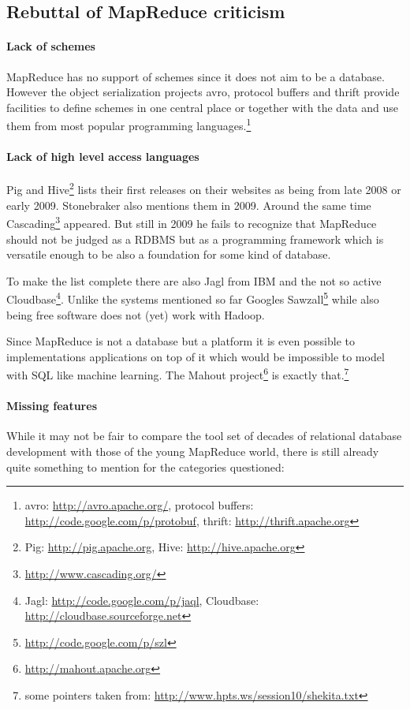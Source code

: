 \documentclass[12pt,a4paper]{scrartcl}		%
\begin{document}
\subsection{Rebuttal of MapReduce criticism}
\paragraph{Lack of schemes}
MapReduce has no support of schemes since it does not aim to be a database. However the object serialization projects avro, protocol buffers and thrift provide facilities to define schemes in one central place or together with the data and use them from most popular programming languages.\footnote{avro: \url{http://avro.apache.org/}, protocol buffers: \url{http://code.google.com/p/protobuf}, thrift: \url{http://thrift.apache.org}}

\paragraph{Lack of high level access languages}
Pig and Hive\footnote{Pig: \url{http://pig.apache.org}, Hive: \url{http://hive.apache.org}} lists their first releases on their websites as being from late 2008 or early 2009. Stonebraker also mentions them in 2009\cite[p. 3, sec. 3.3 programming model]{Pavlo09}. Around the same time Cascading\footnote{\url{http://www.cascading.org/}} appeared. But still in 2009 he fails to recognize that MapReduce should not be judged as a RDBMS but as a programming framework which is versatile enough to be also a foundation for some kind of database.

To make the list complete there are also Jagl from IBM and the not so active Cloudbase\footnote{Jagl: \url{http://code.google.com/p/jaql}, Cloudbase: \url{http://cloudbase.sourceforge.net}}. Unlike the systems mentioned so far Googles Sawzall\footnote{\url{http://code.google.com/p/szl}} while also being free software does not (yet) work with Hadoop.

Since MapReduce is not a database but a platform it is even possible to implementations applications on top of it which would be impossible to model with SQL like machine learning. The Mahout project\footnote{\url{http://mahout.apache.org}} is exactly that.\footnote{some pointers taken from: \url{http://www.hpts.ws/session10/shekita.txt}}

\paragraph{Missing features}
While it may not be fair to compare the tool set of decades of relational database development with those of the young MapReduce world, there is still already quite something to mention for the categories questioned:
\end{document}
